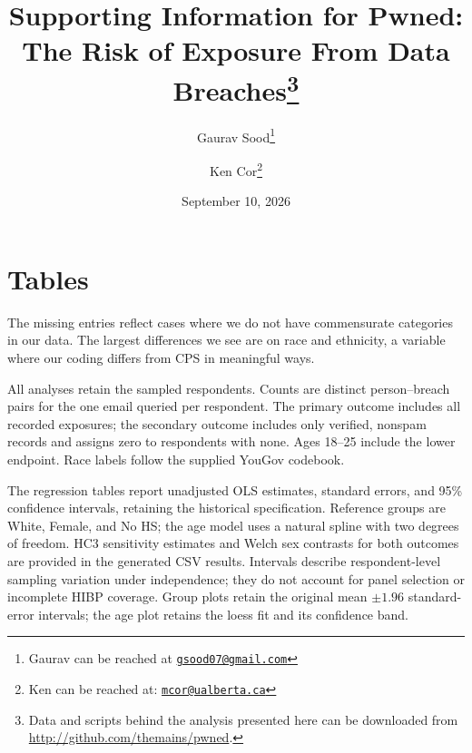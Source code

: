 \documentclass[12pt, letterpaper]{article}
\date{September 10, 2026}
\title{\Large{Supporting Information for Pwned:  The Risk of Exposure From Data Breaches}\footnote{Data and scripts behind the analysis presented here can be downloaded from \url{http://github.com/themains/pwned}.
}}
\author{Gaurav Sood\thanks{Gaurav can be reached at \href{mailto:gsood07@gmail.com}{\footnotesize{\texttt{gsood07@gmail.com}}}} \and Ken Cor\thanks{Ken can be reached at: \href{mailto:mcor@ualberta.ca}{\footnotesize{\texttt{mcor@ualberta.ca}}}}\vspace{.5cm}}
\begin{document}
\maketitle

\begin{center}
\end{center}

\renewcommand{\thesection}{SI \arabic{section}}
\renewcommand\thetable{\thesection.\arabic{table}}
\renewcommand\thefigure{\thesection.\arabic{figure}}

\clearpage
\section{Tables}
\label{fig:si_tables}

The missing entries reflect cases where we do not have commensurate categories in our data. The largest differences we see are on race and ethnicity, a variable where our coding differs from CPS in meaningful ways.

All analyses retain the \sampleSize{} sampled respondents. Counts are distinct person--breach pairs for the one email queried per respondent. The primary outcome includes all recorded exposures; the secondary outcome includes only verified, nonspam records and assigns zero to respondents with none. Ages 18--25 include the lower endpoint. Race labels follow the supplied YouGov codebook.

The regression tables report unadjusted OLS estimates, standard errors, and 95\% confidence intervals, retaining the historical specification. Reference groups are White, Female, and No HS; the age model uses a natural spline with two degrees of freedom. HC3 sensitivity estimates and Welch sex contrasts for both outcomes are provided in the generated CSV results. Intervals describe respondent-level sampling variation under independence; they do not account for panel selection or incomplete HIBP coverage. Group plots retain the original mean $\pm 1.96$ standard-error intervals; the age plot retains the loess fit and its confidence band.
\end{document}
